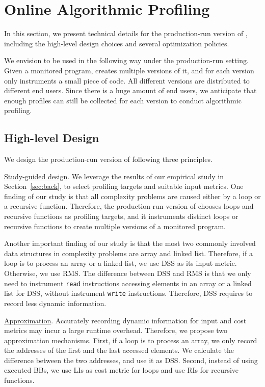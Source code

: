 \section{Online Algorithmic Profiling}
\label{sec:online}

In this section, we present technical details 
for the production-run version of \Tool, 
including the high-level design choices
and several optimization policies. 

We envision \Tool to be used in the following way 
under the production-run setting.
Given a monitored program, \Tool creates multiple versions of it, 
and for each version \Tool only instruments a small piece of code. 
All different versions are distributed to different end users. 
Since there is a huge amount of end users, 
we anticipate that enough profiles can still be collected 
for each version 
to conduct algorithmic profiling. 
 
\subsection{High-level Design}
\label{sec:high}

We design the production-run version 
of \Tool following three principles. 

\noindent\underline{Study-guided design}.
We leverage the results of our empirical study in Section~\ref{sec:back},
to select profiling targets and suitable input metrics.
One finding of our study is that
all complexity problems are 
caused either by a loop or a recursive function. 
Therefore, the production-run version of \Tool chooses loops 
and recursive functions as profiling targets, 
and it instruments distinct loops or recursive functions to create multiple
versions of a monitored program. 

Another important finding of our study
is that the most two commonly involved 
data structures in complexity problems 
are array and linked list.
Therefore, if a loop is to process an array 
or a linked list, we use DSS as its input metric.
Otherwise, we use RMS. 
The difference between DSS and RMS is that 
we only need to instrument \texttt{read} instructions 
accessing elements 
in an array or a linked list for DSS, 
without instrument \texttt{write} instructions.
Therefore, DSS requires to 
record less dynamic information. 

\noindent\underline{Approximation}.
Accurately recording dynamic information for input and cost metrics
may incur a large runtime overhead.
Therefore, we propose two approximation mechanisms. 
First, if a loop is to process an array, 
we only record the addresses of the first 
and the last accessed elements.
We calculate the difference between the two addresses, 
and use it as DSS.
Second, instead of using executed BBs, 
we use LIs as cost metric for loops 
and use RIs for recursive functions. 

